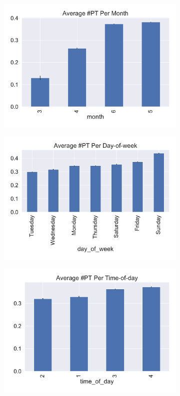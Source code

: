 \documentclass{report}
\begin{document}
\begin{figure}[!htb]
				\centering
				\begin{subfigure}[t]{0.24\textwidth}
					\includegraphics[width=\linewidth]{pt_analysis/avg_number_pt_per_month.pdf}
					\caption{}
				\end{subfigure}
				\begin{subfigure}[t]{0.24\textwidth}
					\includegraphics[width=\linewidth]{pt_analysis/avg_number_pt_per_dayofweek.pdf}
					\caption{}
				\end{subfigure}
				\begin{subfigure}[t]{0.24\textwidth}
					\includegraphics[width=\linewidth]{pt_analysis/avg_number_pt_per_timeofday.pdf}

\end{subfigure}
\end{figure}
\end{document}
